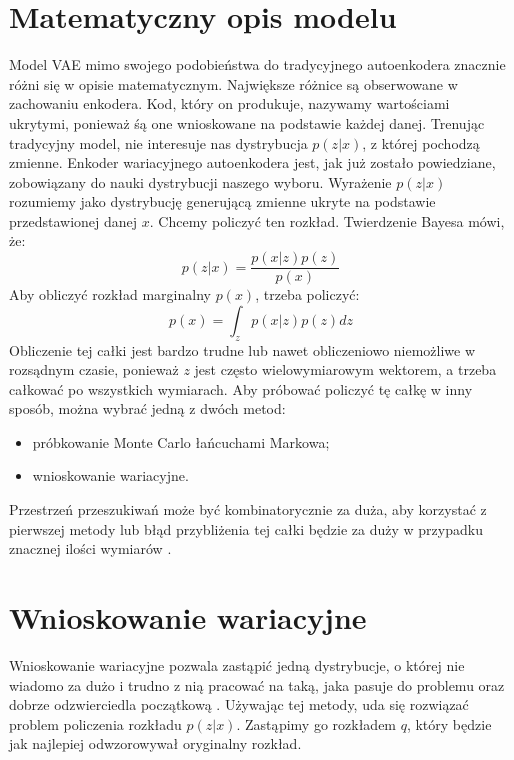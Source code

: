 \documentclass[a4paper,12pt,oneside]{book} %
\begin{document}
\section{Matematyczny opis modelu}
Model VAE mimo swojego podobieństwa do tradycyjnego autoenkodera znacznie różni się w opisie matematycznym. Największe różnice są obserwowane w zachowaniu enkodera. Kod, który on produkuje, nazywamy wartościami ukrytymi, ponieważ śą one wnioskowane na podstawie każdej danej. Trenując tradycyjny model, nie interesuje nas dystrybucja $p(z|x)$, z której pochodzą zmienne. Enkoder wariacyjnego autoenkodera jest, jak już zostało powiedziane, zobowiązany do nauki dystrybucji naszego wyboru. Wyrażenie $p(z|x)$ rozumiemy jako dystrybucję generującą zmienne ukryte na podstawie przedstawionej danej $x$. Chcemy policzyć ten rozkład. Twierdzenie Bayesa mówi, że:
\begin{equation}
	p(z|x)=\dfrac{p(x|z)p(z)}{p(x)}
	\label{bayes}
\end{equation}
Aby obliczyć rozkład marginalny $p(x)$, trzeba policzyć:
\begin{equation}
	p(x) = \displaystyle\int_{z}^{}p(x|z)p(z)dz
	\label{pxcalka}
\end{equation}
Obliczenie tej całki jest bardzo trudne lub nawet obliczeniowo niemożliwe w rozsądnym czasie, ponieważ $z$ jest często wielowymiarowym wektorem, a trzeba całkować po wszystkich wymiarach. Aby próbować policzyć tę całkę w inny sposób, można wybrać jedną z dwóch metod:
\begin{itemize}
	\item próbkowanie Monte Carlo łańcuchami Markowa;
	\item wnioskowanie wariacyjne.
\end{itemize}
Przestrzeń przeszukiwań może być kombinatorycznie za duża, aby korzystać z pierwszej metody lub błąd przybliżenia tej całki będzie za duży w przypadku znacznej ilości wymiarów \cite{salimans2015markov}.

\section{Wnioskowanie wariacyjne}
Wnioskowanie wariacyjne pozwala zastąpić jedną dystrybucje, o której nie wiadomo za dużo i trudno z nią pracować na taką, jaka pasuje do problemu oraz dobrze odzwierciedla początkową \cite{variationalinference}. Używając tej metody, uda się rozwiązać problem policzenia rozkładu $p(z|x)$. Zastąpimy go rozkładem $q$, który będzie jak najlepiej odwzorowywał oryginalny rozkład. 
\end{document}
